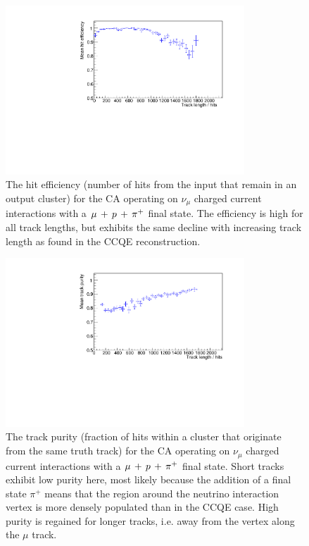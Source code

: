 \begin{figure}
    \centering
    \includegraphics[angle=-90,width=0.8\textwidth]{chapters/cellularautomaton_images/ccpi-efficiency}
    \caption[Hit efficiency for \acs{CCPi} events reconstructed with a CA]{\label{fig:ca-ccpi-efficiency}The hit efficiency (number of hits from the input that remain in an output cluster) for the CA operating on $\nu_\mu$ charged current interactions with a $\mu\,+\,p\,+\,\pi^{+}$ final state. The efficiency is high for all track lengths, but exhibits the same decline with increasing track length as found in the CCQE reconstruction.}
\end{figure}

\begin{figure}
    \centering
    \includegraphics[angle=-90,width=0.8\textwidth]{chapters/cellularautomaton_images/ccpi-purity}
    \caption[Track purity for \acs{CCPi} events reconstructed with a CA]{\label{fig:ca-ccpi-purity}The track purity (fraction of hits within a cluster that originate from the same truth track) for the CA operating on $\nu_\mu$ charged current interactions with a $\mu\,+\,p\,+\,\pi^{+}$ final state. Short tracks exhibit low purity here, most likely because the addition of a final state $\pi^+$ means that the region around the neutrino interaction vertex is more densely populated than in the CCQE case. High purity is regained for longer tracks, i.e. away from the vertex along the $\mu$ track.}
\end{figure}

